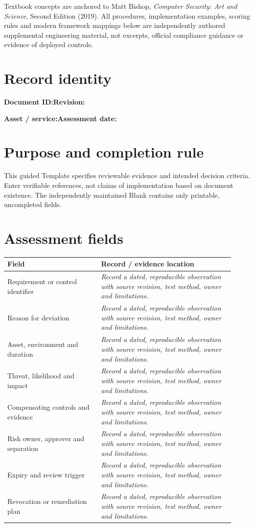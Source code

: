 \documentclass[10pt,letterpaper]{article}
\begin{document}
\makedoctocpage
\begin{notebox}
Textbook concepts are anchored to Matt Bishop, \emph{Computer Security: Art and Science}, Second Edition (2019). All procedures, implementation examples, scoring rules and modern framework mappings below are independently authored supplemental engineering material, not excerpts, official compliance guidance or evidence of deployed controls.
\end{notebox}
\section{Record identity}
\textbf{Document ID:}\enspace\hrulefill\quad\textbf{Revision:}\enspace\hrulefill
\par\medskip\textbf{Asset / service:}\enspace\hrulefill\quad\textbf{Assessment date:}\enspace\hrulefill
\section{Purpose and completion rule}
This guided Template specifies reviewable evidence and intended decision criteria. Enter verifiable references, not claims of implementation based on document existence. The independently maintained Blank contains only printable, uncompleted fields.
\section{Assessment fields}
\renewcommand{\arraystretch}{1.8}
\begin{longtable}{@{}p{0.38\linewidth}p{0.54\linewidth}@{}}
\toprule\textbf{Field}&\textbf{Record / evidence location}\\\midrule\endhead
Requirement or control identifier & \emph{Record a dated, reproducible observation with source revision, test method, owner and limitations.}\\\midrule
Reason for deviation & \emph{Record a dated, reproducible observation with source revision, test method, owner and limitations.}\\\midrule
Asset, environment and duration & \emph{Record a dated, reproducible observation with source revision, test method, owner and limitations.}\\\midrule
Threat, likelihood and impact & \emph{Record a dated, reproducible observation with source revision, test method, owner and limitations.}\\\midrule
Compensating controls and evidence & \emph{Record a dated, reproducible observation with source revision, test method, owner and limitations.}\\\midrule
Risk owner, approver and separation & \emph{Record a dated, reproducible observation with source revision, test method, owner and limitations.}\\\midrule
Expiry and review trigger & \emph{Record a dated, reproducible observation with source revision, test method, owner and limitations.}\\\midrule
Revocation or remediation plan & \emph{Record a dated, reproducible observation with source revision, test method, owner and limitations.}\\\midrule
\bottomrule\end{longtable}
\end{document}
